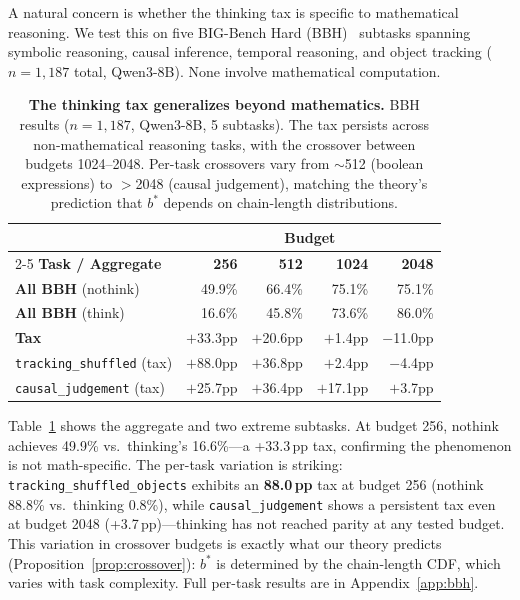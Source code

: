 A natural concern is whether the thinking tax is specific to mathematical
reasoning.
We test this on five BIG-Bench Hard (BBH)~\citep{suzgun2023challenging}
subtasks spanning symbolic reasoning, causal inference, temporal reasoning,
and object tracking ($n{=}1{,}187$ total, Qwen3-8B).
None involve mathematical computation.

\begin{table}[t]
\centering
\small
\caption{\textbf{The thinking tax generalizes beyond mathematics.}
BBH results ($n{=}1{,}187$, Qwen3-8B, 5 subtasks).
The tax persists across non-mathematical reasoning tasks, with the
crossover between budgets 1024--2048.
Per-task crossovers vary from ${\sim}$512 (boolean expressions) to
${>}$2048 (causal judgement), matching the theory's prediction that
$b^*$ depends on chain-length distributions.}
\label{tab:bbh-main}
\begin{tabular}{@{}lrrrr@{}}
\toprule
& \multicolumn{4}{c}{\textbf{Budget}} \\
\cmidrule(l){2-5}
\textbf{Task / Aggregate} & \textbf{256} & \textbf{512} & \textbf{1024} & \textbf{2048} \\
\midrule
\textbf{All BBH} (nothink) & 49.9\% & 66.4\% & 75.1\% & 75.1\% \\
\textbf{All BBH} (think) & 16.6\% & 45.8\% & 73.6\% & 86.0\% \\
\textbf{Tax} & $+$33.3pp & $+$20.6pp & $+$1.4pp & $-$11.0pp \\
\midrule
\texttt{tracking\_shuffled} (tax) & $+$88.0pp & $+$36.8pp & $+$2.4pp & $-$4.4pp \\
\texttt{causal\_judgement} (tax) & $+$25.7pp & $+$36.4pp & $+$17.1pp & $+$3.7pp \\
\bottomrule
\end{tabular}
\vspace{-2mm}
\end{table}

Table~\ref{tab:bbh-main} shows the aggregate and two extreme subtasks.
At budget 256, nothink achieves 49.9\% vs.\ thinking's 16.6\%---a
+33.3\,pp tax, confirming the phenomenon is not math-specific.
The per-task variation is striking:
\texttt{tracking\_shuffled\_objects} exhibits an \textbf{88.0\,pp} tax at
budget 256 (nothink 88.8\% vs.\ thinking 0.8\%), while
\texttt{causal\_judgement} shows a persistent tax even at budget 2048
(+3.7\,pp)---thinking has not reached parity at any tested budget.
This variation in crossover budgets is exactly what our theory predicts
(Proposition~\ref{prop:crossover}): $b^*$ is determined by the chain-length
CDF, which varies with task complexity.
Full per-task results are in Appendix~\ref{app:bbh}.

